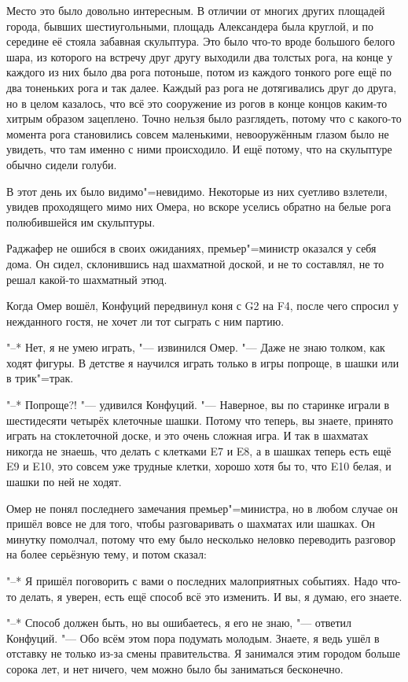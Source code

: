 Место это было довольно интересным.
В отличии от многих других площадей города, бывших шестиугольными, площадь
Александера была круглой, и по середине её стояла забавная скульптура.
Это было что-то вроде большого белого шара, из которого на встречу друг другу
выходили два толстых рога, на конце у каждого из них было два рога потоньше,
потом из каждого тонкого роге ещё по два тоненьких рога и так далее.
Каждый раз рога не дотягивались друг до друга, но в целом казалось, что всё это
сооружение из рогов в конце концов каким-то хитрым образом зацеплено.
Точно нельзя было разглядеть, потому что с какого-то момента рога становились
совсем маленькими, невооружённым глазом было не увидеть, что там именно с ними
происходило.
И ещё потому, что на скульптуре обычно сидели голуби.

В этот день их было видимо"=невидимо.
Некоторые из них суетливо взлетели, увидев проходящего мимо них Омера, но вскоре
уселись обратно на белые рога полюбившейся им скульптуры.

Раджафер не ошибся в своих ожиданиях, премьер"=министр оказался у себя дома.
Он сидел, склонившись над шахматной доской, и не то составлял, не то решал
какой-то шахматный этюд.

Когда Омер вошёл, Конфуций передвинул коня с G2 на F4, после чего спросил у
нежданного гостя, не хочет ли тот сыграть с ним партию.

"--* Нет, я не умею играть, "--- извинился Омер.
"--- Даже не знаю толком, как ходят фигуры.
В детстве я научился играть только в игры попроще, в шашки или в трик"=трак.

"--* Попроще?! "--- удивился Конфуций.
"--- Наверное, вы по старинке играли в шестидесяти четырёх клеточные шашки.
Потому что теперь, вы знаете, принято играть на стоклеточной доске, и это очень
сложная игра.
И так в шахматах никогда не знаешь, что делать с клетками E7 и E8, а в шашках
теперь есть ещё E9 и E10, это совсем уже трудные клетки, хорошо хотя бы то, что
E10 белая, и шашки по ней не ходят.

Омер не понял последнего замечания премьер"=министра, но в любом случае он
пришёл вовсе не для того, чтобы разговаривать о шахматах или шашках.
Он минутку помолчал, потому что ему было несколько неловко переводить разговор
на более серьёзную тему, и потом сказал:

"--* Я пришёл поговорить с вами о последних малоприятных событиях.
Надо что-то делать, я уверен, есть ещё способ всё это изменить.
И вы, я думаю, его знаете.

"--* Способ должен быть, но вы ошибаетесь, я его не знаю, "--- ответил
Конфуций.
"--- Обо всём этом пора подумать молодым.
Знаете, я ведь ушёл в отставку не только из-за смены правительства.
Я занимался этим городом больше сорока лет, и нет ничего, чем можно было бы
заниматься бесконечно.

